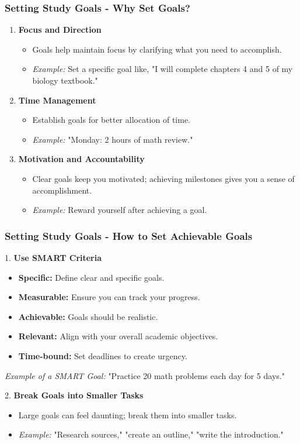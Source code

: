 \documentclass[aspectratio=169]{beamer}
\begin{document}
\begin{frame}[fragile]
    \frametitle{Setting Study Goals - Why Set Goals?}
    \begin{enumerate}
        \item \textbf{Focus and Direction}
            \begin{itemize}
                \item Goals help maintain focus by clarifying what you need to accomplish.
                \item \textit{Example:} Set a specific goal like, "I will complete chapters 4 and 5 of my biology textbook."
            \end{itemize}
        \item \textbf{Time Management}
            \begin{itemize}
                \item Establish goals for better allocation of time.
                \item \textit{Example:} "Monday: 2 hours of math review."
            \end{itemize}
        \item \textbf{Motivation and Accountability}
            \begin{itemize}
                \item Clear goals keep you motivated; achieving milestones gives you a sense of accomplishment.
                \item \textit{Example:} Reward yourself after achieving a goal.
            \end{itemize}
    \end{enumerate}
\end{frame}

\begin{frame}[fragile]
    \frametitle{Setting Study Goals - How to Set Achievable Goals}
    
    1. \textbf{Use SMART Criteria}
        \begin{itemize}
            \item \textbf{Specific:} Define clear and specific goals.
            \item \textbf{Measurable:} Ensure you can track your progress.
            \item \textbf{Achievable:} Goals should be realistic.
            \item \textbf{Relevant:} Align with your overall academic objectives.
            \item \textbf{Time-bound:} Set deadlines to create urgency.
        \end{itemize}
        \textit{Example of a SMART Goal:} "Practice 20 math problems each day for 5 days."
        
    2. \textbf{Break Goals into Smaller Tasks}
        \begin{itemize}
            \item Large goals can feel daunting; break them into smaller tasks.
            \item \textit{Example:} "Research sources," "create an outline," "write the introduction."
        \end{itemize}
\end{frame}
\end{document}
